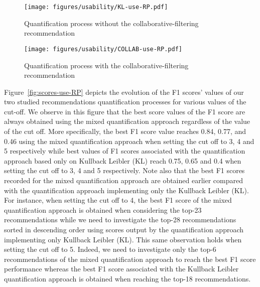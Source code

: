  \begin{figure*}
        \begin{subfigure}[b]{0.4\textwidth}
            \centering
            \texttt{[image: figures/usability/KL-use-RP.pdf]}
     \caption[Quantification process without the collaborative-filtering recommendation]
      {{\small Quantification process without the collaborative-filtering recommendation}}   
            \label{fig:KLdist}
        \end{subfigure}
       \hspace{2.5em}
        \begin{subfigure}[b]{0.4\textwidth}  
            \centering 
          \texttt{[image: figures/usability/COLLAB-use-RP.pdf]}   
        \caption[Quantification process  with the collaborative-filtering recommendation]
      {{\small Quantification process with the collaborative-filtering recommendation}}    
            \label{fig:EU-dist}
        \end{subfigure}

        \caption[Comparison of performances between the two quantification methods]
       {\small Comparison of performances between the two quantification methods} 
        \label{fig:scores-use-RP}
    \end{figure*}




Figure~\ref{fig:scores-use-RP} depicts the evolution of the F1 scores' values of our two studied recommendations quantification processes for various values of the cut-off.
We observe in this figure that the best score values of the F1 score are always obtained using the mixed quantification approach regardless of the value of the cut off.
More specifically, the best F1 score value reaches 0.84, 0.77, and 0.46 using the mixed quantification approach when setting the cut off to 3, 4 and 5 respectively while best values of F1 scores associated with the quantification approach based only on Kullback Leibler (KL) reach 0.75, 0.65 and 0.4 when setting the cut off to 3, 4 and 5 respectively.
Note also that the best F1 scores recorded for the mixed quantification approach are obtained earlier compared with the quantification approach implementing only the Kullback Leibler (KL).
For instance, when setting the cut off to 4, the best F1 score of the mixed quantification approach is obtained when considering the top-23 recommendations while we need to investigate the top-28 recommendations sorted in descending order using scores output by the quantification approach implementing only Kullback Leibler (KL). This same observation holds when setting the cut off to 5. Indeed, we need to investigate only the top-6 recommendations of the mixed quantification approach to reach the best F1 score performance whereas the best F1 score associated with the Kullback Leibler quantification approach is obtained when reaching the top-18 recommendations. 



